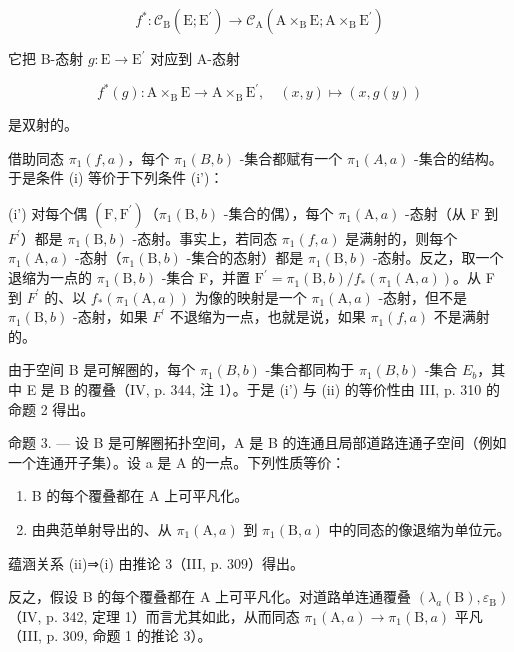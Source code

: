 \[
f ^ {*} \colon \mathscr {C} _ {\mathrm{B}} (\mathrm{E}; \mathrm{E} ^ {\prime}) \rightarrow \mathscr {C} _ {\mathrm{A}} (\mathrm{A} \times_ {\mathrm{B}} \mathrm{E}; \mathrm{A} \times_ {\mathrm{B}} \mathrm{E} ^ {\prime})
\]

它把 B-态射 \(g\colon \mathrm{E}\to \mathrm{E}^{\prime}\) 对应到 A-态射

\[
f ^ {*} (g) \colon \mathrm{A} \times_ {\mathrm{B}} \mathrm{E} \rightarrow \mathrm{A} \times_ {\mathrm{B}} \mathrm{E} ^ {\prime}, \quad (x, y) \mapsto (x, g (y))
\]

是双射的。

借助同态 \(\pi_1(f, a)\)，每个 \(\pi_1(B, b)\) -集合都赋有一个 \(\pi_1(A, a)\) -集合的结构。于是条件 (i) 等价于下列条件 (i')：

(i') 对每个偶 \((\mathrm{F},\mathrm{F}^{\prime})\)（\(\pi_{1}(\mathrm{B},b)\) -集合的偶），每个 \(\pi_{1}(\mathrm{A},a)\) -态射（从 F 到 \(F^{\prime}\)）都是 \(\pi_{1}(\mathrm{B},b)\) -态射。事实上，若同态 \(\pi_{1}(f,a)\) 是满射的，则每个 \(\pi_{1}(\mathrm{A},a)\) -态射（\(\pi_{1}(\mathrm{B},b)\) -集合的态射）都是 \(\pi_{1}(\mathrm{B},b)\) -态射。反之，取一个退缩为一点的 \(\pi_{1}(\mathrm{B},b)\) -集合 F，并置 \(\mathrm{F}^{\prime}=\pi_{1}(\mathrm{B},b)/f_{*}(\pi_{1}(\mathrm{A},a))\)。从 F 到 \(F^{\prime}\) 的、以 \(f_{*}(\pi_{1}(\mathrm{A},a))\) 为像的映射是一个 \(\pi_{1}(\mathrm{A},a)\) -态射，但不是 \(\pi_{1}(\mathrm{B},b)\) -态射，如果 \(F^{\prime}\) 不退缩为一点，也就是说，如果 \(\pi_{1}(f,a)\) 不是满射的。

由于空间 B 是可解圈的，每个 \(\pi_{1}(B,b)\) -集合都同构于 \(\pi_{1}(B,b)\) -集合 \(E_{b}\)，其中 E 是 B 的覆叠（IV, p. 344, 注 1）。于是 (i') 与 (ii) 的等价性由 III, p. 310 的命题 2 得出。

命题 3. --- 设 B 是可解圈拓扑空间，A 是 B 的连通且局部道路连通子空间（例如一个连通开子集）。设 a 是 A 的一点。下列性质等价：

\begin{enumerate}
\def\labelenumi{(\roman{enumi})}
\item
  B 的每个覆叠都在 A 上可平凡化。
\item
  由典范单射导出的、从 \(\pi_{1}(\mathrm{A},a)\) 到 \(\pi_{1}(\mathrm{B},a)\) 中的同态的像退缩为单位元。
\end{enumerate}

蕴涵关系 (ii)⇒(i) 由推论 3（III, p. 309）得出。

反之，假设 B 的每个覆叠都在 A 上可平凡化。对道路单连通覆叠 \((\lambda_{a}(\mathrm{B}),\varepsilon_{\mathrm{B}})\)（IV, p. 342, 定理 1）而言尤其如此，从而同态 \(\pi_{1}(\mathrm{A},a)\to\pi_{1}(\mathrm{B},a)\) 平凡（III, p. 309, 命题 1 的推论 3）。

